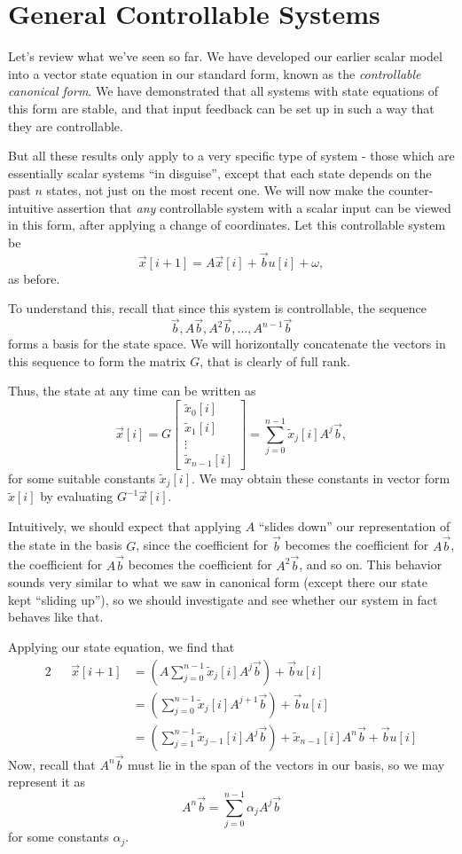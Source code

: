 \documentclass[letterpaper]{article}
\theoremstyle{remark}
\renewcommand{\tilde}[1]{\widetilde{#1}}
\newcommand{\mat}[1]{\ensuremath{\begin{bmatrix}#1\end{bmatrix}}}
\newcommand{\eqn}[1]{\begin{alignat*}{2}#1\end{alignat*}}
\begin{document}
\section{General Controllable Systems}
Let's review what we've seen so far. We have developed our earlier scalar model into a vector state equation in our standard form, known as the \emph{controllable canonical form}. We have demonstrated that all systems with state equations of this form are stable, and that input feedback can be set up in such a way that they are controllable.

But all these results only apply to a very specific type of system - those which are essentially scalar systems ``in disguise'', except that each state depends on the past $n$ states, not just on the most recent one. We will now make the counter-intuitive assertion that \emph{any} controllable system with a scalar input can be viewed in this form, after applying a change of coordinates. Let this controllable system be
\[
    \vec{x}[i + 1] = A\vec{x}[i] + \vec{b}u[i] + \omega,
\]
as before.

To understand this, recall that since this system is controllable, the sequence
\[
    \vec{b}, A\vec{b}, A^2\vec{b}, \ldots, A^{n-1}\vec{b}
\]
forms a basis for the state space. We will horizontally concatenate the vectors in this sequence to form the matrix $G$, that is clearly of full rank.

Thus, the state at any time can be written as
\[
    \vec{x}[i] = G\mat{\tilde{x}_0[i] \\ \tilde{x}_1[i] \\ \vdots \\ \tilde{x}_{n-1}[i]} = \sum_{j = 0}^{n - 1} \tilde{x}_j[i] A^j \vec{b},
\]
for some suitable constants $\tilde{x}_j[i]$. We may obtain these constants in vector form $\tilde{x}[i]$ by evaluating $G^{-1}\vec{x}[i]$.

Intuitively, we should expect that applying $A$ ``slides down'' our representation of the state in the basis $G$, since the coefficient for $\vec{b}$ becomes the coefficient for $A\vec{b}$, the coefficient for $A\vec{b}$ becomes the coefficient for $A^2\vec{b}$, and so on. This behavior sounds very similar to what we saw in canonical form (except there our state kept ``sliding up''), so we should investigate and see whether our system in fact behaves like that.

Applying our state equation, we find that
\eqn{
    && \vec{x}[i + 1] &= \left(A\sum_{j = 0}^{n - 1} \tilde{x}_j[i] A^j \vec{b}\right) + \vec{b}u[i] \\
    &&&= \left(\sum_{j = 0}^{n - 1} \tilde{x}_j[i] A^{j + 1} \vec{b}\right) + \vec{b}u[i] \\
    &&&= \left(\sum_{j = 1}^{n - 1} \tilde{x}_{j-1}[i] A^{j} \vec{b}\right) + \tilde{x}_{n-1}[i]A^n\vec{b} + \vec{b}u[i]
}
Now, recall that $A^n\vec{b}$ must lie in the span of the vectors in our basis, so we may represent it as
\[
    A^n\vec{b} = \sum_{j=0}^{n-1} \alpha_jA^j\vec{b}
\]
for some constants $\alpha_j$.
\end{document}
